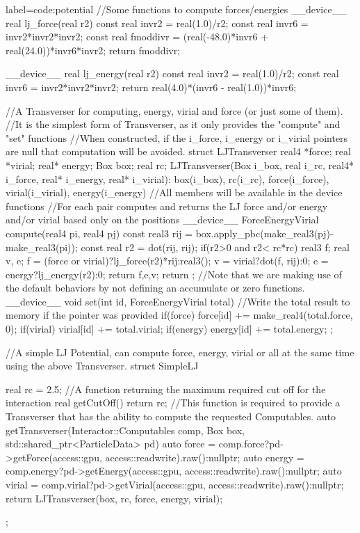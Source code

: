\documentclass[ twoside,openright,titlepage,numbers=noenddot,%
headinclude,footinclude,cleardoublepage=empty,abstract=on,
BCOR=5mm,paper=a4,fontsize=11pt, dvipsnames
]{scrreprt}
\begin{document}
\begin{code2}{label=code:potential}
  //Some functions to compute forces/energies
  __device__ real lj_force(real r2){
    const real invr2 = real(1.0)/r2;
    const real invr6 = invr2*invr2*invr2;
    const real fmoddivr = (real(-48.0)*invr6 + real(24.0))*invr6*invr2;
    return fmoddivr;
  }

  __device__ real lj_energy(real r2){
    const real invr2 = real(1.0)/r2;
    const real invr6 = invr2*invr2*invr2;
    return real(4.0)*(invr6 - real(1.0))*invr6;
  }

  //A Transverser for computing, energy, virial and force (or just some of them).
  //It is the simplest form of Transverser, as it only provides the "compute" and "set" functions
  //When constructed, if the i_force, i_energy or i_virial pointers are null that computation will be avoided.
  struct LJTransverser{
    real4 *force;
    real *virial;
    real* energy;
    Box box;
    real rc;
    LJTransverser(Box i_box, real i_rc, real4* i_force, real* i_energy, real* i_virial):
    box(i_box), rc(i_rc), force(i_force), virial(i_virial), energy(i_energy){
      //All members will be available in the device functions
    }
    //For each pair computes and returns the LJ force and/or energy and/or virial based only on the positions
    __device__ ForceEnergyVirial compute(real4 pi, real4 pj){
      const real3 rij = box.apply_pbc(make_real3(pj)-make_real3(pi));
      const real r2 = dot(rij, rij);
      if(r2>0 and r2< rc*rc){
        real3 f;
        real v, e;        
        f = (force or virial)?lj_force(r2)*rij:real3();	
        v = virial?dot(f, rij):0;
        e = energy?lj_energy(r2):0;
        return {f,e,v};
      }
      return {};
    }
    //Note that we are making use of the default behaviors by not defining an accumulate or zero functions.
    __device__ void set(int id, ForceEnergyVirial total){
      //Write the total result to memory if the pointer was provided
      if(force)  force[id] += make_real4(total.force, 0);
      if(virial) virial[id] += total.virial;
      if(energy) energy[id] += total.energy;
    }
  };

//A simple LJ Potential, can compute force, energy, virial or all at the same time using the above Transverser.
struct SimpleLJ{
  real rc = 2.5;
  //A function returning the maximum required cut off for the interaction
  real getCutOff(){
    return rc;
  }
  //This function is required to provide a Transverser that has the ability to compute the requested Computables.
  auto getTransverser(Interactor::Computables comp,
  Box box,
  std::shared_ptr<ParticleData> pd){
    auto force = comp.force?pd->getForce(access::gpu, access::readwrite).raw():nullptr;
    auto energy = comp.energy?pd->getEnergy(access::gpu, access::readwrite).raw():nullptr;
    auto virial = comp.virial?pd->getVirial(access::gpu, access::readwrite).raw():nullptr;
    return LJTransverser(box, rc, force, energy, virial);
  }
  
};
\end{code2}
\end{document}
